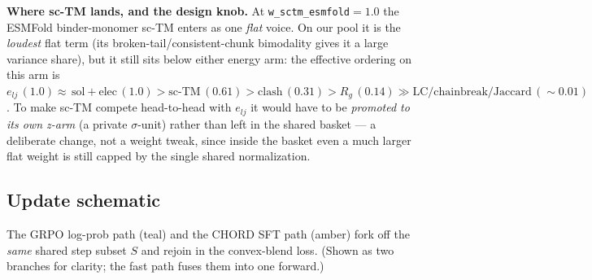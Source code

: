 \documentclass[11pt]{article}
\newcommand{\ttk}[1]{\texttt{\small #1}}
\begin{document}
\textbf{Where sc-TM lands, and the design knob.} At \ttk{w\_sctm\_esmfold}$=1.0$ the ESMFold
binder-monomer sc-TM enters as one \emph{flat} voice. On our pool it is the \emph{loudest} flat term
(its broken-tail/consistent-chunk bimodality gives it a large variance share), but it still sits below
either energy arm: the effective ordering on this arm is
$e_{lj}\,(1.0)\approx\,\text{sol}{+}\text{elec}\,(1.0) > \text{sc-TM}\,(0.61) > \text{clash}\,(0.31) >
R_g\,(0.14) \gg \text{LC/chainbreak/Jaccard}\,(\sim\!0.01)$. To make sc-TM compete head-to-head with
$e_{lj}$ it would have to be \emph{promoted to its own z-arm} (a private $\sigma$-unit) rather than
left in the shared basket --- a deliberate change, not a weight tweak, since inside the basket even a
much larger flat weight is still capped by the single shared normalization.

\subsection{Update schematic}
The GRPO log-prob path (teal) and the CHORD SFT path (amber) fork off the \emph{same} shared step
subset $S$ and rejoin in the convex-blend loss. (Shown as two branches for clarity; the fast path
fuses them into one forward.)
\end{document}
